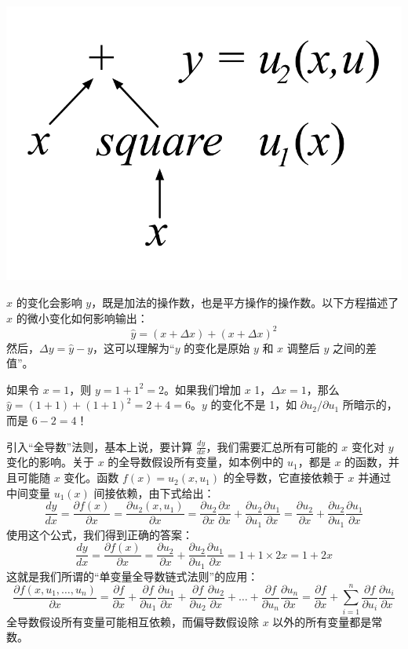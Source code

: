 \documentclass[11pt]{article}
\begin{document}
\begin{center}
\includegraphics{plus-square.png}
\end{center}

$x$ 的变化会影响 $y$，既是加法的操作数，也是平方操作的操作数。以下方程描述了 $x$ 的微小变化如何影响输出：
\[\hat y = (x + \Delta x) + (x + \Delta x)^2\]
然后，$\Delta y = \hat y - y$，这可以理解为“$y$ 的变化是原始 $y$ 和 $x$ 调整后 $y$ 之间的差值”。

如果令 $x=1$，则 $y=1+1^2=2$。如果我们增加 $x$ 1，$\Delta x=1$，那么 $\hat y = (1+1) + (1+1)^2 = 2 + 4 = 6$。$y$ 的变化不是 1，如 $\partial u_2 / \partial u_1$ 所暗示的，而是 $6-2 = 4$！

引入“全导数”法则，基本上说，要计算 $\frac{dy}{dx}$，我们需要汇总所有可能的 $x$ 变化对 $y$ 变化的影响。关于 $x$ 的全导数假设所有变量，如本例中的 $u_1$，都是 $x$ 的函数，并且可能随 $x$ 变化。函数 $f(x) = u_2(x,u_1)$ 的全导数，它直接依赖于 $x$ 并通过中间变量 $u_1(x)$ 间接依赖，由下式给出：
\[\frac{dy}{dx} = \frac{\partial f(x)}{\partial x} = \frac{\partial u_2(x,u_1)}{\partial x} = \frac{\partial u_2}{\partial x}\frac{\partial x}{\partial x} + \frac{\partial u_2}{\partial u_1}\frac{\partial u_1}{\partial x} = \frac{\partial u_2}{\partial x} + \frac{\partial u_2}{\partial u_1}\frac{\partial u_1}{\partial x}\]
使用这个公式，我们得到正确的答案：
\[
\frac{dy}{dx} = \frac{\partial f(x)}{\partial x} = \frac{\partial u_2}{\partial x} + \frac{\partial u_2}{\partial u_1}\frac{\partial  u_1}{\partial  x} = 1 + 1 \times 2x = 1 + 2x
\]
这就是我们所谓的“单变量全导数链式法则”的应用：
\[
\frac{\partial f(x,u_1,\ldots,u_n)}{\partial x} = \frac{\partial f}{\partial x} + \frac{\partial f}{\partial u_1}\frac{\partial  u_1}{\partial  x} + \frac{\partial f}{\partial u_2}\frac{\partial  u_2}{\partial  x} + \ldots + \frac{\partial f}{\partial u_n}\frac{\partial  u_n}{\partial x} = \frac{\partial f}{\partial x} + \sum_{i=1}^n \frac{\partial f}{\partial u_i}\frac{\partial  u_i}{\partial  x}
\]
全导数假设所有变量可能相互依赖，而偏导数假设除 $x$ 以外的所有变量都是常数。
\end{document}
